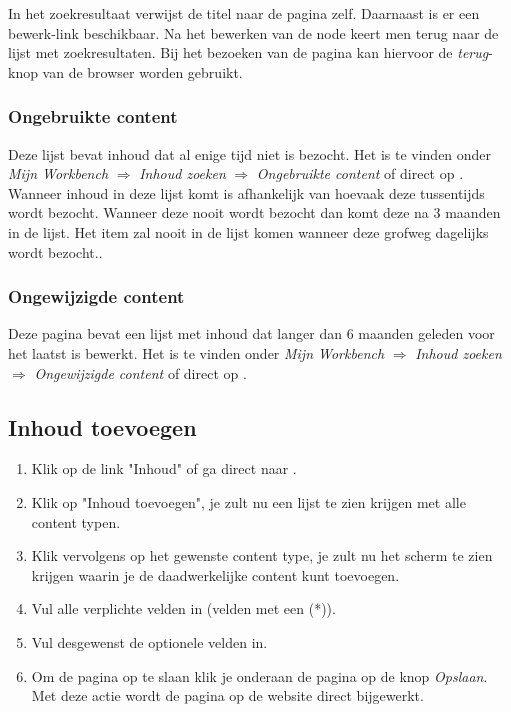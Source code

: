 In het zoekresultaat verwijst de titel naar de pagina zelf. Daarnaast is er een bewerk-link beschikbaar. Na het bewerken van de node keert men terug naar de lijst met zoekresultaten. Bij het bezoeken van de pagina kan hiervoor de \emph{terug}-knop van de browser worden gebruikt.

\subsubsection{Ongebruikte content}
Deze lijst bevat inhoud dat al enige tijd niet is bezocht. Het is te vinden onder \emph{Mijn Workbench} $\Rightarrow$ \emph{Inhoud zoeken} $\Rightarrow$ \emph{Ongebruikte content} of direct op . Wanneer inhoud in deze lijst komt is afhankelijk van hoevaak deze tussentijds wordt bezocht. Wanneer deze nooit wordt bezocht dan komt deze na 3 maanden in de lijst. Het item zal nooit in de lijst komen wanneer deze grofweg dagelijks wordt bezocht..

\subsubsection{Ongewijzigde content}
Deze pagina bevat een lijst met inhoud dat langer dan 6 maanden geleden voor het laatst is bewerkt. Het is te vinden onder \emph{Mijn Workbench} $\Rightarrow$ \emph{Inhoud zoeken} $\Rightarrow$ \emph{Ongewijzigde content} of direct op .

\subsection{Inhoud toevoegen}\label{inhoudtoevoegen}
\begin{enumerate}
\item Klik op de link "Inhoud" of ga direct naar .
\item Klik op "Inhoud toevoegen", je zult nu een lijst te zien krijgen met alle content typen.
\item Klik vervolgens op het gewenste content type, je zult nu het scherm te zien krijgen waarin je de daadwerkelijke content kunt toevoegen.
\item Vul alle verplichte velden in (velden met een (*)).
\item Vul desgewenst de optionele velden in.
\item Om de pagina op te slaan klik je onderaan de pagina op de knop \emph{Opslaan}. Met deze actie wordt de pagina op de website direct bijgewerkt.
\end{enumerate}

